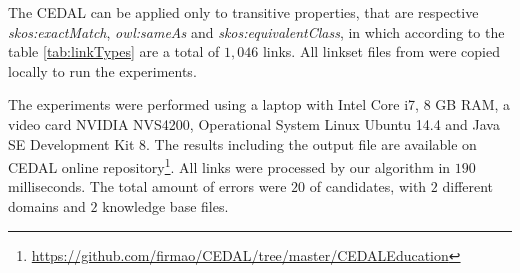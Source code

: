 The CEDAL can be applied only to transitive properties, that are respective \emph{skos:exactMatch}, \emph{owl:sameAs} and \emph{skos:equivalentClass}, in which according to the table \ref{tab:linkTypes} are a total of $1,046$ links. All linkset files from were copied locally to run the experiments.

\begin{table}[htb] 
\centering
\caption{Educational Linksets}
\label{tab:linkTypes}
\end{table}
%
The experiments were performed using a laptop with Intel Core i7, 8 GB RAM, a video card NVIDIA NVS4200, Operational System Linux Ubuntu 14.4 and Java SE Development Kit 8. The results including the output file are available on CEDAL online repository\footnote{\url{https://github.com/firmao/CEDAL/tree/master/CEDALEducation}}.
All links were processed by our algorithm in $190$ milliseconds. The total amount of errors were $20$ of candidates, with $2$ different domains and $2$ knowledge base files.

